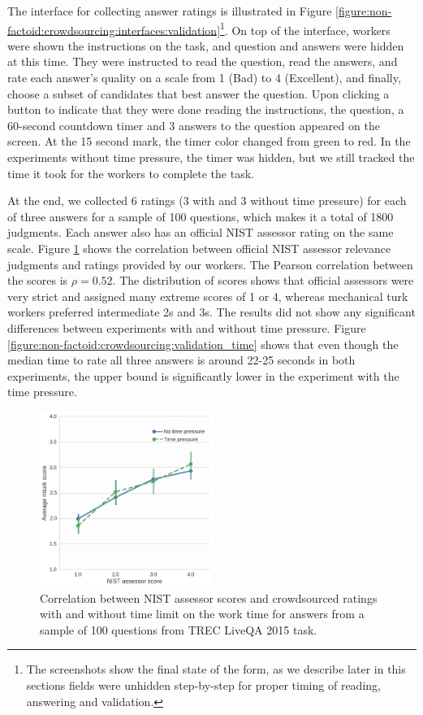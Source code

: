 The interface for collecting answer ratings is illustrated in Figure \ref{figure:non-factoid:crowdsourcing:interfaces:validation}\footnote{The screenshots show the final state of the form, as we describe later in this sections fields were unhidden step-by-step for proper timing of reading, answering and validation.}.
On top of the interface, workers were shown the instructions on the task, and question and answers were hidden at this time.
They were instructed to read the question, read the answers, and rate each answer's quality on a scale from 1 (Bad) to 4 (Excellent), and finally, choose a subset of candidates that best answer the question.
Upon clicking a button to indicate that they were done reading the instructions, the question, a 60-second countdown timer and 3 answers to the question appeared on the screen.
At the 15 second mark, the timer color changed from green to red.
In the experiments without time pressure, the timer was hidden, but we still tracked the time it took for the workers to complete the task.

At the end, we collected 6 ratings (3 with and 3 without time pressure) for each of three answers for a sample of 100 questions, which makes it a total of 1800 judgments.
Each answer also has an official NIST assessor rating on the same scale.
Figure \ref{figure:non-factoid:crowdsourcing:score_correlation} shows the correlation between official NIST assessor relevance judgments and ratings provided by our workers.
The Pearson correlation between the scores is $\rho=0.52$.
The distribution of scores shows that official assessors were very strict and assigned many extreme scores of 1 or 4, whereas mechanical turk workers preferred intermediate 2s and 3s.
The results did not show any significant differences between experiments with and without time pressure.
Figure \ref{figure:non-factoid:crowdsourcing:validation_time} shows that even though the median time to rate all three answers is around 22-25 seconds in both experiments, the upper bound is significantly lower in the experiment with the time pressure.

\begin{figure}
    \centering
    \includegraphics[width=0.5\textwidth]{img/score_correlation}
    \caption{Correlation between NIST assessor scores and crowdsourced ratings with and without time limit on the work time for answers from a sample of 100 questions from TREC LiveQA 2015 task.}
    \label{figure:non-factoid:crowdsourcing:score_correlation}
\end{figure}

